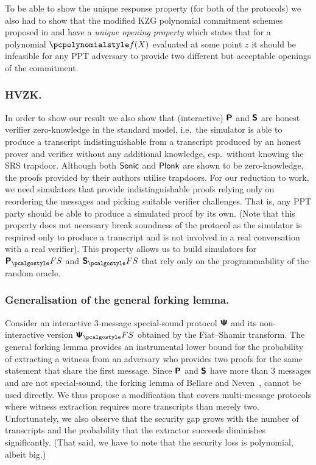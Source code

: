 \documentclass[runningheads,11pt]{llncs}
\begin{document}
To be able to show the unique response property (for both of the protocols) we
also had to show that the modified KZG polynomial commitment schemes
\cite{AC:KatZavGol10} proposed in \cite{EPRINT:GabWilCio19} and
\cite{CCS:MBKM19} have a \emph{unique opening property} which states that for a
polynomial $\p{f}(X)$ evaluated at some point $z$ it should be infeasible for
any PPT adversary to provide two different but acceptable openings
of the commitment.

\subsubsection{HVZK.}%
In order to show our result we also show that (interactive) $\bm{\mathsf{P}}$ and
$\bm{\mathsf{S}}$ are honest verifier zero-knowledge in the standard model, i.e.~the
simulator is able to produce a transcript indistinguishable from a transcript
produced by an honest prover and verifier without any additional knowledge,
esp.~without knowing the SRS trapdoor. Although both ${\textnormal{\textsf{Sonic}}}$ and $\textnormal{\textsf{Plonk}}$ are
shown to be zero-knowledge, the proofs provided by their authors utilise
trapdoors. For our reduction to work, we need simulators that provide
indistinguishable proofs relying only on reordering the messages
and picking suitable verifier challenges. That is, any PPT party should be
able to produce a simulated proof by its own. (Note that this property does not
necessary break soundness of the protocol as the simulator is required only to
produce a transcript and is not involved in a real conversation with a real
verifier). This property allows us to build simulators for $\plonkprotfs$ and
$\sonicprotfs$ that rely only on the programmability of the random oracle.

\subsubsection{Generalisation of the general forking lemma.}
Consider an interactive $3$-message special-sound protocol $\bm{\mathsf{\Psi}}$ and its
non-interactive version $\ps_\fs$ obtained by the Fiat--Shamir transform. The
general forking lemma provides an instrumental lower bound for the probability of
extracting a witness from an adversary who provides two proofs for the same
statement that share the first message. Since $\bm{\mathsf{P}}$ and $\bm{\mathsf{S}}$ have
more than $3$ messages and are not special-sound, the forking lemma of Bellare and Neven~\cite{CCS:BelNev06}, cannot be used directly. We thus propose a modification
that covers multi-message protocols where witness extraction requires more
transcripts than merely two.  Unfortunately, we also observe that the security
gap grows with the number of transcripts and the probability that the extractor
succeeds diminishes significantly. (That said, we have to note that the security
loss is polynomial, albeit big.)
\end{document}
